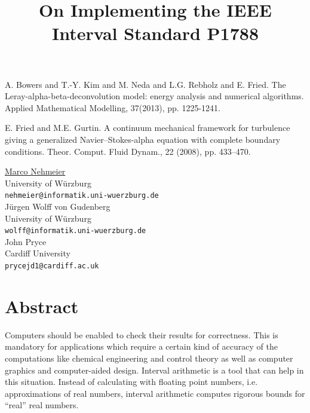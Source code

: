 \documentclass[article, A4, 11pt]{llncs}%
\begin{document}

\begin{thebibliography}{10}
{\sc A. Bowers and T.-Y. Kim and M. Neda and L.G. Rebholz and E. Fried}. {The Leray-alpha-beta-deconvolution model: energy analysis and numerical algorithms}. Applied Mathematical Modelling, 37(2013), pp. 1225-1241.

{\sc E. Fried and M.E. Gurtin}. {A continuum mechanical framework for turbulence giving a generalized Navier–Stokes-alpha equation with complete boundary conditions}. Theor. Comput. Fluid Dynam., 22 (2008), pp. 433–470.
\end{thebibliography} %

\title{On Implementing  the IEEE Interval Standard P1788}
 \author{} \institute{}
\maketitle
\begin{center}
{\large \underline{Marco Nehmeier}}\\
University of W\"urzburg\\
{\tt nehmeier@informatik.uni-wuerzburg.de}
\\ \vspace{4mm}
{\large J\"urgen Wolff von Gudenberg}\\
University of W\"urzburg\\
{\tt wolff@informatik.uni-wuerzburg.de}
\\ \vspace{4mm}
{\large John Pryce}\\
Cardiff University\\
{\tt prycejd1@cardiff.ac.uk}
\end{center}

\section*{Abstract}
Computers should be enabled 
to check their results for correctness. 
This is mandatory for applications which require a certain kind of accuracy of the computations like chemical engineering and control theory  as well as computer graphics and computer-aided 
design. Interval arithmetic is a tool that can help in this situation. Instead of calculating with floating point numbers, i.e. approximations of real numbers, interval arithmetic computes rigorous bounds for ``real'' real numbers. 
\end{document}
